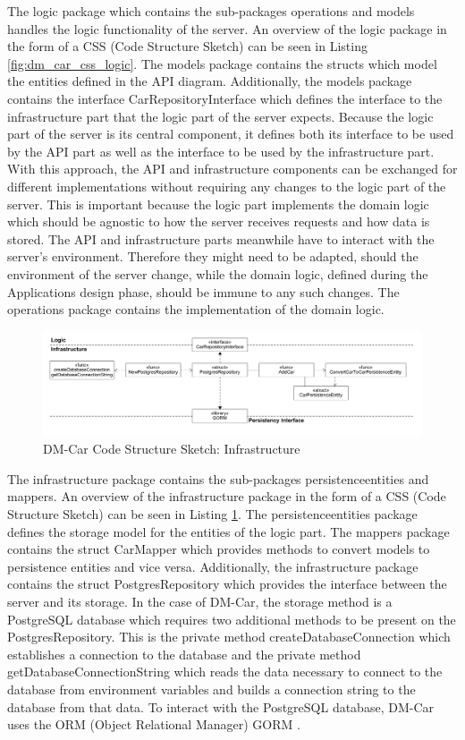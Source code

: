 The logic package which contains the sub-packages operations and models handles
the logic functionality of the server. An overview of the logic package in the form of a CSS (Code Structure Sketch)
can be seen in Listing \ref{fig:dm_car_css_logic}. The models package contains the structs
which model the entities defined in the API diagram. Additionally, the models
package contains the interface CarRepositoryInterface which defines the
interface to the infrastructure part that the logic part of the server expects.
Because the logic part of the server is its central component, it defines both
its interface to be used by the API part as well as the interface to be used by
the infrastructure part. With this approach, the API and infrastructure
components can be exchanged for different implementations without requiring any
changes to the logic part of the server. This is important because the logic
part implements the domain logic which should be agnostic to how the server
receives requests and how data is stored. The API and infrastructure parts
meanwhile have to interact with the server's environment. Therefore they might
need to be adapted, should the environment of the server change, while the
domain logic, defined during the Applications design phase, should be immune
to any such changes. The operations package contains the implementation of the
domain logic.

\begin{figure}[tb]
	\centering
	\includegraphics[width=\textwidth]{figures/dm_car_css_infrastructure.png}
	\caption{DM-Car Code Structure Sketch: Infrastructure}
	\label{fig:dm_car_css_infrastructure}
\end{figure}

The infrastructure package contains the sub-packages persistenceentities and mappers.
An overview of the infrastructure package in the form of a CSS (Code Structure Sketch)
can be seen in Listing \ref{fig:dm_car_css_infrastructure}. The
persistenceentities package defines the storage model for the entities of the logic part.
The mappers package contains the struct CarMapper which provides methods to convert
models to persistence entities and vice versa. Additionally, the infrastructure
package contains the struct PostgresRepository which provides the interface between
the server and its storage. In the case of DM-Car, the storage method is a
PostgreSQL \cite{POS-DOCS} database which requires two additional methods to
be present on the PostgresRepository. This is the private method createDatabaseConnection
which establishes a connection to the database and the private method getDatabaseConnectionString which
reads the data necessary to connect to the database from environment variables
and builds a connection string to the database from that data.
To interact with the PostgreSQL database, DM-Car uses the ORM (Object Relational Manager)
GORM \cite{Ji23}.

